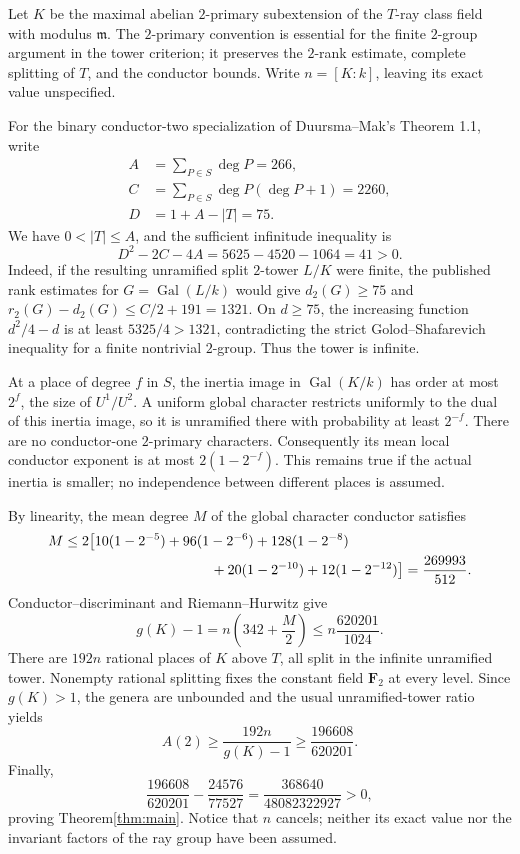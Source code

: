 \documentclass[11pt]{article}
\newcommand{\F}{\mathbf F}
\begin{document}
Let $K$ be the maximal abelian $2$-primary subextension of the $T$-ray class
field with modulus $\mathfrak m$. The $2$-primary convention is essential for
the finite $2$-group argument in the tower criterion; it preserves the
$2$-rank estimate, complete splitting of $T$, and the conductor bounds.
Write $n=[K:k]$, leaving its exact value unspecified.

For the binary conductor-two specialization of Duursma--Mak's Theorem 1.1,
write
\begin{align*}
 A&=\sum_{P\in S}\deg P=266,\\
 C&=\sum_{P\in S}\deg P(\deg P+1)=2260,\\
 D&=1+A-|T|=75.
\end{align*}
We have $0<|T|\le A$, and the sufficient infinitude inequality is
\begin{equation}\label{eq:GS}
 D^2-2C-4A=5625-4520-1064=41>0.
\end{equation}
Indeed, if the resulting unramified split $2$-tower $L/K$ were finite, the
published rank estimates for $G=\operatorname{Gal}(L/k)$ would give
$d_2(G)\ge75$ and $r_2(G)-d_2(G)\le C/2+191=1321$.
On $d\ge75$, the increasing function $d^2/4-d$ is at least $5325/4>1321$,
contradicting the strict Golod--Shafarevich inequality for a finite nontrivial
$2$-group. Thus the tower is infinite.

At a place of degree $f$ in $S$, the inertia image in $\operatorname{Gal}(K/k)$
has order at most $2^f$, the size of $U^1/U^2$. A uniform global character
restricts uniformly to the dual of this inertia image, so it is unramified
there with probability at least $2^{-f}$. There are no conductor-one
$2$-primary characters. Consequently its mean local conductor exponent is at
most $2(1-2^{-f})$. This remains true if the actual inertia is smaller;
no independence between different places is assumed.

By linearity, the mean degree $M$ of the global character conductor satisfies
\begin{align*}
 M&\le2\bigl[10(1-2^{-5})+96(1-2^{-6})+128(1-2^{-8})\\
 &\hspace{37mm}+20(1-2^{-10})+12(1-2^{-12})\bigr]
 =\frac{269993}{512}.
\end{align*}
Conductor--discriminant and Riemann--Hurwitz give
\[
 g(K)-1=n\left(342+\frac M2\right)\le n\frac{620201}{1024}.
\]
There are $192n$ rational places of $K$ above $T$, all split in the infinite
unramified tower. Nonempty rational splitting fixes the constant field
$\F_2$ at every level. Since $g(K)>1$, the genera are unbounded and the
usual unramified-tower ratio yields
\[
 A(2)\ge \frac{192n}{g(K)-1}\ge\frac{196608}{620201}.
\]
Finally,
\[
 \frac{196608}{620201}-\frac{24576}{77527}
 =\frac{368640}{48082322927}>0,
\]
proving Theorem\ref{thm:main}. Notice that $n$ cancels; neither its exact
value nor the invariant factors of the ray group have been assumed.
\end{document}

